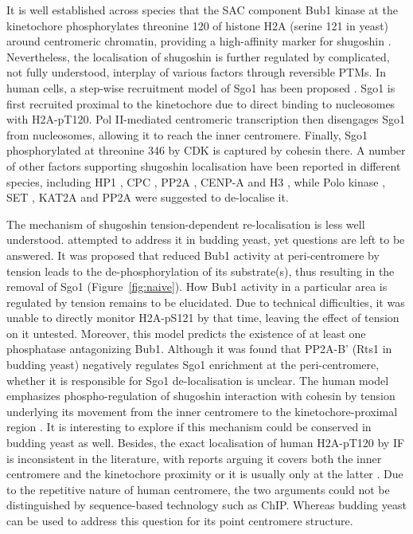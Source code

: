 It is well established across species that the SAC component Bub1 kinase at the kinetochore phosphorylates threonine 120 of histone H2A (serine 121 in yeast) around centromeric chromatin, providing a high-affinity marker for shugoshin \citep{Rivera2012, Boyarchuk2007Bub1Centromere, Williams2017Bub1Kinetochores, Kitajima2005, Perera2010, Tang2004, Fernius2007Bub1Mitosis, Kiburz2005, Kawashima2010a}. Nevertheless, the localisation of shugoshin is further regulated by complicated, not fully understood, interplay of various factors through reversible PTMs. In human cells, a step-wise recruitment model of Sgo1 has been proposed \citep{Liu2013, Liu2013a, Liu2015}. Sgo1 is first recruited proximal to the kinetochore due to direct binding to nucleosomes with H2A-pT120. Pol II-mediated centromeric transcription then disengages Sgo1 from nucleosomes, allowing it to reach the inner centromere. Finally, Sgo1 phosphorylated at threonine 346 by CDK is captured by cohesin there. A number of other factors supporting shugoshin localisation have been reported in different species, including HP1 \citep{Yamagishi2008, Kang2011, Perera2010}, CPC \citep{Huang2007, Tanno2010, Rivera2012, Kawashima2007, Boyarchuk2007Bub1Centromere, Resnick2006INCENPDrosophila}, PP2A \citep{Tang2006a}, CENP-A \citep{Petty2018ConnectingCheckpoint, Eot-Houllier2018AuroraFatigue, Mishra2018BuddingChromatin} and H3 \citep{Buehl2018a, Luo2016}, while Polo kinase \citep{Clarke2005}, SET \citep{Qu2019SETSegregation, Krishnan2017Phospho-H1Mitosis}, KAT2A \citep{Petty2018ConnectingCheckpoint} and PP2A \citep{Nerusheva2014} were suggested to de-localise it. 

The mechanism of shugoshin tension-dependent re-localisation is less well understood. \cite{Nerusheva2014} attempted to address it in budding yeast, yet questions are left to be answered. It was proposed that reduced Bub1 activity at peri-centromere by tension leads to the de-phosphorylation of its substrate(s), thus resulting in the removal of Sgo1 (Figure~\ref{fig:naive}). How Bub1 activity in a particular area is regulated by tension remains to be elucidated. Due to technical difficulties, it was unable to directly monitor H2A-pS121 by that time, leaving the effect of tension on it untested. Moreover, this model predicts the existence of at least one phosphatase antagonizing Bub1. Although it was found that PP2A-B' (Rts1 in budding yeast) negatively regulates Sgo1 enrichment at the peri-centromere, whether it is responsible for Sgo1 de-localisation is unclear. The human model emphasizes phospho-regulation of shugoshin interaction with cohesin by tension underlying its movement from the inner centromere to the kinetochore-proximal region \citep{Liu2013, Liu2015}. It is interesting to explore if this mechanism could be conserved in budding yeast as well. Besides, the exact localisation of human H2A-pT120 by IF is inconsistent in the literature, with reports arguing it covers both the inner centromere \citep{Yamagishi2010} and the kinetochore proximity or it is usually only at the latter \citep{Liu2013}. Due to the repetitive nature of human centromere, the two arguments could not be distinguished by sequence-based technology such as ChIP. Whereas budding yeast can be used to address this question for its point centromere structure. 

